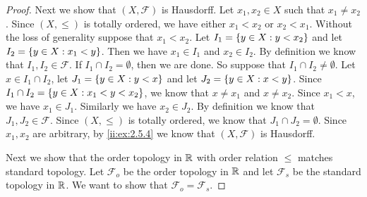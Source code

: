 \begin{proof}
  Next we show that \((X, \mathcal{F})\) is Hausdorff.
  Let \(x_1, x_2 \in X\) such that \(x_1 \neq x_2\).
  Since \((X, \leq)\) is totally ordered, we have either \(x_1 < x_2\) or \(x_2 < x_1\).
  Without the loss of generality suppose that \(x_1 < x_2\).
  Let \(I_1 = \left\lbrace y \in X : y < x_2\right\rbrace\) and let \(I_2 = \left\lbrace y \in X : x_1 < y\right\rbrace\).
  Then we have \(x_1 \in I_1\) and \(x_2 \in I_2\).
  By definition we know that \(I_1, I_2 \in \mathcal{F}\).
  If \(I_1 \cap I_2 = \emptyset\), then we are done.
  So suppose that \(I_1 \cap I_2 \neq \emptyset\).
  Let \(x \in I_1 \cap I_2\), let \(J_1 = \left\lbrace y \in X : y < x\right\rbrace\) and let \(J_2 = \left\lbrace y \in X : x < y\right\rbrace\).
  Since \(I_1 \cap I_2 = \left\lbrace y \in X : x_1 < y < x_2\right\rbrace\), we know that \(x \neq x_1\) and \(x \neq x_2\).
  Since \(x_1 < x\), we have \(x_1 \in J_1\).
  Similarly we have \(x_2 \in J_2\).
  By definition we know that \(J_1, J_2 \in \mathcal{F}\).
  Since \((X, \leq)\) is totally ordered, we know that \(J_1 \cap J_2 = \emptyset\).
  Since \(x_1, x_2\) are arbitrary, by \cref{ii:ex:2.5.4} we know that \((X, \mathcal{F})\) is Hausdorff.

  Next we show that the order topology in \(\mathbb{R}\) with order relation \(\leq\) matches standard topology.
  Let \(\mathcal{F}_o\) be the order topology in \(\mathbb{R}\) and let \(\mathcal{F}_s\) be the standard topology in \(\mathbb{R}\).
  We want to show that \(\mathcal{F}_o = \mathcal{F}_s\).


\end{proof}
